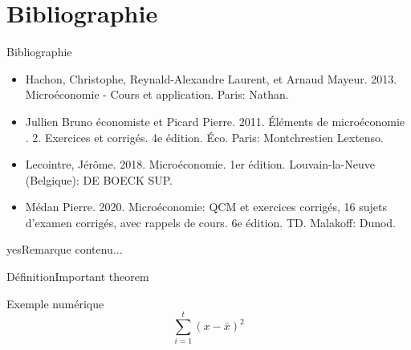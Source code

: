 \documentclass{beamer}
\begin{document}
\section{Bibliographie}
\begin{frame}{Bibliographie}
	
	\begin{itemize}
		\item Hachon, Christophe, Reynald-Alexandre Laurent, et Arnaud Mayeur. 2013. Microéconomie - Cours et application. Paris: Nathan.
		\item Jullien Bruno économiste et Picard Pierre. 2011. Éléments de microéconomie . 2. Exercices et corrigés. 4e édition. Éco. Paris: Montchrestien Lextenso.
		\item Lecointre, Jérôme. 2018. Microéconomie. 1er édition. Louvain-la-Neuve (Belgique): DE BOECK SUP.
		\item Médan Pierre. 2020. Microéconomie: QCM et exercices corrigés, 16 sujets d’examen corrigés, avec rappels de cours. 6e édition. TD. Malakoff: Dunod.
	\end{itemize}


\end{frame}	
	
	
	\begin{frame}
		\begin{block}{yes}{Remarque}
			contenu...
		\end{block}
		
		\begin{alertblock}{Définition}{Important theorem} 
			
		\end{alertblock}
		
		\begin{exampleblock}{Exemple numérique}
			\[ 
			\sum_{i=1}^{t}(x-\bar{x})^2
			\]
		\end{exampleblock}
	\end{frame}
	
	
	
\end{document}
